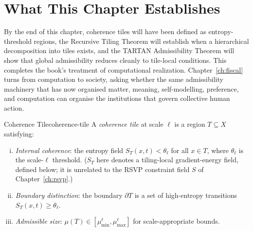 \documentclass[12pt,twoside,openright]{book}
\begin{document}
\section{What This Chapter Establishes}
\label{sec:ch26-preview}

By the end of this chapter, coherence tiles will have been
defined as entropy-threshold regions, the Recursive Tiling
Theorem will establish when a hierarchical decomposition into
tiles exists, and the TARTAN Admissibility Theorem will show
that global admissibility reduces cleanly to tile-local
conditions. This completes the book's treatment of
computational realization. Chapter~\ref{ch:fiscal} turns from
computation to society, asking whether the same admissibility
machinery that has now organised matter, meaning,
self-modelling, preference, and computation can organise the
institutions that govern collective human action.

\begin{definition}{Coherence Tile}{coherence-tile}
  A \emph{coherence tile} at scale $\ell$ is a region
  $T \subseteq X$ satisfying:
  \begin{enumerate}[(i)]
    \item \emph{Internal coherence}: the entropy field
          $S_T(x, t) < \theta_\ell$ for all $x \in T$,
          where $\theta_\ell$ is the scale-$\ell$
          threshold. ($S_T$ here denotes a tiling-local
          gradient-energy field, defined below; it is
          unrelated to the RSVP constraint field $S$ of
          Chapter~\ref{ch:rsvp}.)
    \item \emph{Boundary distinction}: the boundary
          $\partial T$ is a set of high-entropy transitions
          $S_T(x,t) \ge \theta_\ell$.
    \item \emph{Admissible size}: $\mu(T) \in
          [\mu_{\min}^\ell, \mu_{\max}^\ell]$ for
          scale-appropriate bounds.
  \end{enumerate}
\end{definition}
\end{document}
